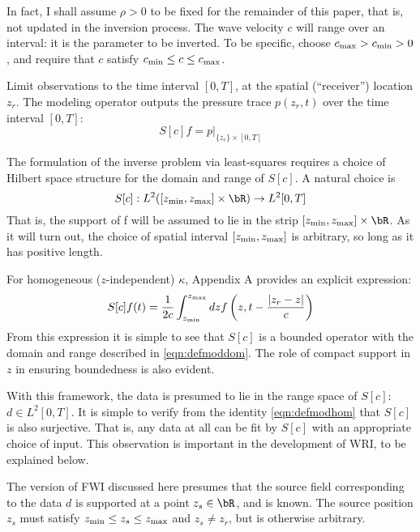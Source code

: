 In fact, I shall assume $\rho>0$ to be fixed for the remainder of this
paper, that is, not updated in the inversion process. The wave
velocity $c$ will range over an interval: it is the parameter to be inverted.
To be specific, choose $c_{\rm max} > c_{\rm min} > 0$, and require
that $c$ satisfy $c_{\rm min} \le c \le c_{\rm max}$.

Limit observations to the time interval $[0,T]$, at the spatial (``receiver'')  location $z_r$. The modeling operator outputs the pressure trace $p(z_r,t)$ over the time interval $[0,T]$:
\begin{equation}
  \label{eqn:defmod}
  S[c]f = p|_{\{z_r\}\times [0,T]}
\end{equation}

The formulation of the inverse problem via least-squares requires a choice of Hilbert space structure for the domain and range of $S[c]$. A natural choice is
\begin{equation}
  \label{eqn:defmoddom}
  S[c]: L^2([z_{\rm min},z_{\rm max}] \times \bR) \rightarrow L^2[0,T]
\end{equation}
That is, the support of f will be assumed to lie in the strip $[z_{\rm min},z_{\rm max}] \times \bR$.
As it will turn out, the choice of spatial interval $[z_{\rm min},z_{\rm max}]$ is arbitrary, so long as it has positive length.

For homogeneous ($z$-independent) $\kappa$, Appendix A provides an explicit expression:
\begin{equation}
  \label{eqn:defmodhom}
  S[c]f(t) = \frac{1}{2c}\int_{z_{\rm min}}^{z_{\rm max}} dz f\left(z,t - \frac{|z_r-z|}{c}\right) 
\end{equation}
From this expression it is simple to see that $S[c]$ is a bounded
operator with the domain and range described in
\ref{eqn:defmoddom}. The role of compact support in $z$ in ensuring
boundedness is also evident.

With this framework, the data is presumed to lie in the range space of
$S[c]$: $d \in L^2[0,T]$. It is simple to verify from the identity
\ref{eqn:defmodhom} that $S[c]$ is also surjective. That is, any data
at all can be fit by $S[c]$ with an appropriate choice of input. This
observation is important in the development of WRI, to be explained
below.

The version of FWI discussed here presumes that the source field
corresponding to the data $d$ is supported at a point $z_s \in \bR$,
and is known. The source position $z_s$ must satisfy $z_{\rm min} \le
z_s \le z_{\rm max}$ and $z_s \ne z_r$, but is otherwise arbitrary.

